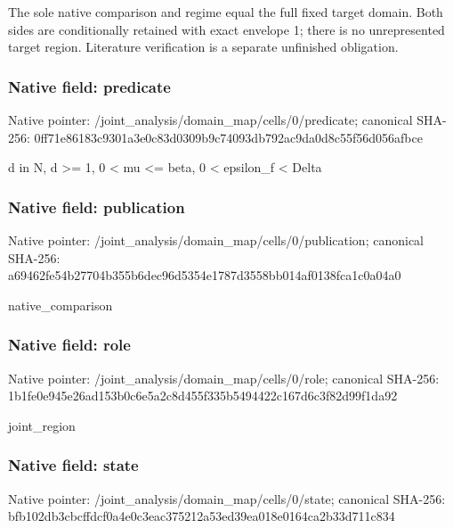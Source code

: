 \documentclass[10pt,a4paper]{article}
\begin{document}
\begingroup\raggedright\sloppy The sole native comparison and regime equal the full fixed target domain. Both sides are conditionally retained with exact envelope 1;\allowbreak{} there is no unrepresented target region. Literature verification is a separate unfinished obligation.\par\endgroup

\subsubsection{Native field: predicate}
Native pointer: /joint\_\allowbreak{}analysis/domain\_\allowbreak{}map/cells/0/predicate; canonical SHA-256: 0ff71e86183c9301a3e0c83d0309b9c74093db792ac9da0d8c55f56d056afbce

\begingroup\raggedright\sloppy d in N,\allowbreak{} d >=\allowbreak{} 1,\allowbreak{} 0 < mu <=\allowbreak{} beta,\allowbreak{} 0 < epsilon\_\allowbreak{}f < Delta\par\endgroup

\subsubsection{Native field: publication}
Native pointer: /joint\_\allowbreak{}analysis/domain\_\allowbreak{}map/cells/0/publication; canonical SHA-256: a69462fe54b27704b355b6dec96d5354e1787d3558bb014af0138fca1c0a04a0

\begingroup\raggedright\sloppy native\_\allowbreak{}comparison\par\endgroup

\subsubsection{Native field: role}
Native pointer: /joint\_\allowbreak{}analysis/domain\_\allowbreak{}map/cells/0/role; canonical SHA-256: 1b1fe0e945e26ad153b0c6e5a2c8d455f335b5494422c167d6c3f82d99f1da92

\begingroup\raggedright\sloppy joint\_\allowbreak{}region\par\endgroup

\subsubsection{Native field: state}
Native pointer: /joint\_\allowbreak{}analysis/domain\_\allowbreak{}map/cells/0/state; canonical SHA-256: bfb102db3cbcffdcf0a4e0c3eac375212a53ed39ea018e0164ca2b33d711c834
\end{document}
